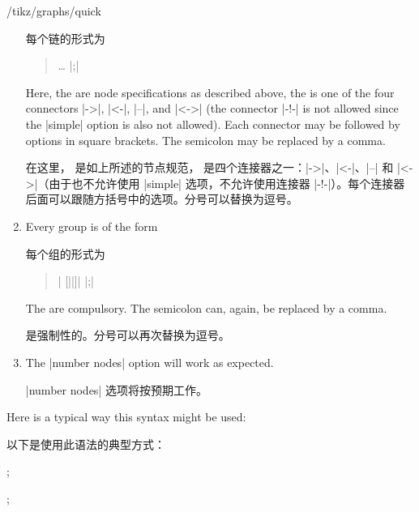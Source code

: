 \begin{key}{/tikz/graphs/quick}
\begin{enumerate}
        每个链的形式为
            \begin{quote}
                  
                 \dots {} |;|
            \end{quote}

            Here, the  are node specifications as described
            above, the  is one of the four connectors |->|,
            |<-|, |--|, and |<->| (the connector |-!-| is not allowed since the
            |simple| option is also not allowed). Each connector may be
            followed by options in square brackets. The semicolon may be
            replaced by a comma.

            在这里， 是如上所述的节点规范， 是四个连接器之一：|->|、|<-|、|--| 和 |<->|（由于也不允许使用 |simple| 选项，不允许使用连接器 |-!-|）。每个连接器后面可以跟随方括号中的选项。分号可以替换为逗号。

        \item Every group is of the form

        每个组的形式为

            \begin{quote}
                |{ [||]|  |};|
            \end{quote}
            The  are compulsory. The semicolon can, again, be
            replaced by a comma.

             是强制性的。分号可以再次替换为逗号。

        \item The |number nodes| option will work as expected.

        |number nodes| 选项将按预期工作。
    \end{enumerate}

    Here is a typical way this syntax might be used:
    
    以下是使用此语法的典型方式：
\begin{codeexample}[preamble={\usetikzlibrary{graphs,quotes}}]
\tikz {};
\end{codeexample}

\begin{codeexample}[preamble={\usetikzlibrary{graphs}}]
\tikz {};
\end{codeexample}


\end{key}
